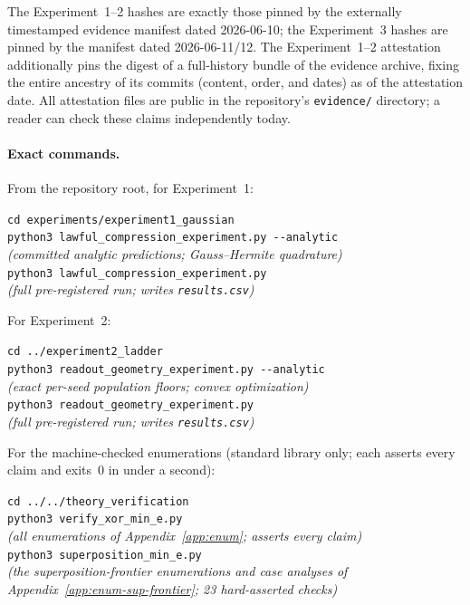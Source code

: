 \documentclass[twocolumn,10pt]{article}
\theoremstyle{definition}
\theoremstyle{remark}
\begin{document}
The Experiment~1--2 hashes are exactly those pinned by the externally
timestamped evidence manifest dated 2026-06-10; the Experiment~3
hashes are pinned by the manifest dated 2026-06-11/12. The
Experiment~1--2 attestation additionally pins the
digest of a full-history bundle of the evidence archive, fixing the
entire ancestry of its commits (content, order, and dates) as of the
attestation date. All attestation files are public in the
repository's \texttt{evidence/} directory; a reader can check these
claims independently today.

\paragraph{Exact commands.} From the repository root, for
Experiment~1:
\begin{flushleft}\footnotesize
\texttt{cd experiments/experiment1\_gaussian}\\
\texttt{python3 lawful\_compression\_experiment.py -{}-analytic}\\
{\itshape \hspace*{1.5em}(committed analytic predictions;
Gauss--Hermite quadrature)}\\
\texttt{python3 lawful\_compression\_experiment.py}\\
{\itshape \hspace*{1.5em}(full pre-registered run; writes
\textup{\texttt{results.csv}})}
\end{flushleft}
For Experiment~2:
\begin{flushleft}\footnotesize
\texttt{cd ../experiment2\_ladder}\\
\texttt{python3 readout\_geometry\_experiment.py -{}-analytic}\\
{\itshape \hspace*{1.5em}(exact per-seed population floors;
convex optimization)}\\
\texttt{python3 readout\_geometry\_experiment.py}\\
{\itshape \hspace*{1.5em}(full pre-registered run; writes
\textup{\texttt{results.csv}})}
\end{flushleft}
For the machine-checked enumerations (standard library only; each
asserts every claim and exits~0 in under a second):
\begin{flushleft}\footnotesize
\texttt{cd ../../theory\_verification}\\
\texttt{python3 verify\_xor\_min\_e.py}\\
{\itshape \hspace*{1.5em}(all enumerations of
Appendix~\ref{app:enum}; asserts every claim)}\\
\texttt{python3 superposition\_min\_e.py}\\
{\itshape \hspace*{1.5em}(the superposition-frontier enumerations and
case analyses of Appendix~\ref{app:enum-sup-frontier}; 23
hard-asserted checks)}
\end{flushleft}
\end{document}
